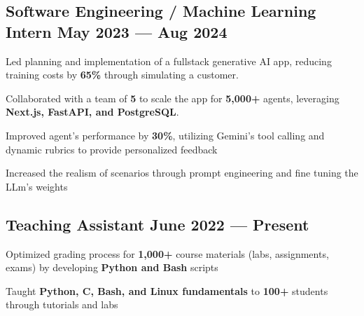 
\subsection{{Software Engineering / Machine Learning Intern \hfill May 2023 --- Aug 2024}}
\begin{zitemize}
    \item Led planning and implementation of a fullstack generative AI app, reducing training costs by \textbf{65\%} through simulating a customer.
    \item Collaborated with a team of \textbf{5} to scale the app for \textbf{5,000+} agents, leveraging \textbf{Next.js, FastAPI, and PostgreSQL}.
    \item Improved agent's performance by \textbf{30\%}, utilizing Gemini's tool calling and dynamic rubrics to provide personalized feedback
    \item Increased the realism of scenarios through prompt engineering and fine tuning the LLm's weights
\end{zitemize}


\subsection{{Teaching Assistant \hfill June 2022 --- Present}}
\begin{zitemize}
    \item Optimized grading process for \textbf{1,000+} course materials (labs, assignments, exams) by developing \textbf{Python and Bash} scripts
    \item Taught \textbf{Python, C, Bash, and Linux fundamentals} to \textbf{100+} students through tutorials and labs
\end{zitemize}


